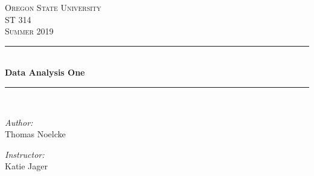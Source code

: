 \documentclass[letterpaper, onecolumn,10pt]{IEEEtran}
\begin{document}
    \begin{titlepage}
    \newcommand{\HRule}{\rule{\linewidth}{0.5mm}}
    \center
    \textsc{\Large Oregon State University}\\[1.5cm]
    \textsc{\Large ST 314}\\[0.5cm]
    \textsc{\Large Summer 2019}\\[0.5cm]
    \HRule \\[0.4cm]
    { \huge \bfseries Data Analysis One}\\[0.4cm] %
    \HRule \\[1.5cm]
    \begin{minipage}{0.4\textwidth}
        \begin{flushleft} \large
        \emph{Author:}\\
        Thomas Noelcke
        \end{flushleft}
    \end{minipage}
    \begin{minipage}{0.4\textwidth}
        \begin{flushright} \large
        \emph{Instructor:} \\
        Katie Jager\\
        \end{flushright}
    \end{minipage}\\[2cm]
		\end{titlepage}
        

\end{document}
